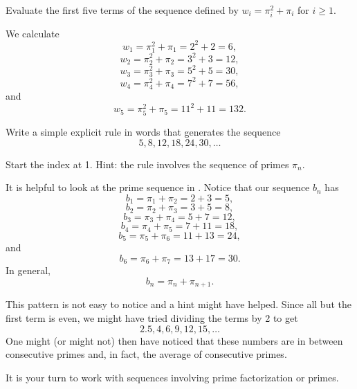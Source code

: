 \begin{exam}
\label{seq_involving_pisubn}
~ 
    \begin{apart}
        \item Evaluate the first five terms of the sequence defined by $w_i=\pi_i^2 + \pi_i$ for $i \ge 1$.
            \begin{soln}
            We calculate $$w_1 = \pi_1^2 + \pi_1 = 2^2 + 2 = 6,$$
            $$w_2 = \pi_2^2 + \pi_2 = 3^2 + 3 = 12,$$
            $$w_3 = \pi_3^2 + \pi_3 = 5^2 + 5 = 30,$$
            $$w_4 = \pi_4^2 + \pi_4 = 7^2 + 7 = 56,$$
            and
            $$w_5 = \pi_5^2 + \pi_5 = 11^2 + 11 = 132.$$
            \end{soln}
    
        \item Write a simple explicit rule in words that generates the sequence 
        $$5, 8, 12, 18, 24, 30,\ldots$$
        
        Start the index at 1. Hint: the rule involves the  sequence of primes $\pi_n$.  %
            \begin{soln}
              It is helpful to look at the prime sequence in .  Notice that our sequence $b_n$ has 
              $$b_1 =\pi_1+\pi_2=2+3=5,$$ $$b_2=\pi_2+\pi_3=3+5=8,$$ $$b_3=\pi_3+\pi_4=5+7=12,$$ $$b_4=\pi_4+\pi_5=7+11=18,$$ $$b_5=\pi_5+\pi_6=11+13=24,$$and
              $$b_6=\pi_6+\pi_7=13+17=30.$$In general, $$b_n=\pi_n + \pi_{n+1}.$$

              This pattern is not easy to notice and a hint might have helped.  Since all but the first term is even, we might have tried dividing the terms by 2 to get
              $$2.5, 4, 6, 9, 12, 15, \ldots$$
              One might (or might not) then have noticed that these numbers are in between consecutive primes and, in fact, the average of consecutive primes. 
            \end{soln}
    \end{apart}
\end{exam}

It is your turn to work with sequences involving prime factorization or primes.

